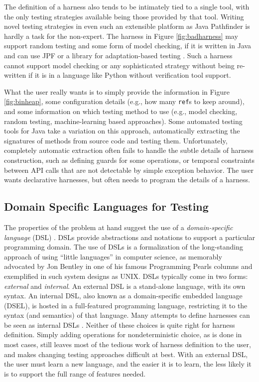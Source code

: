\documentclass[runningheads,a4paper]{llncs}
\begin{document}
The definition of a harness also tends to be intimately tied to a
single tool, with the only testing strategies available being those
provided by that tool.  Writing novel testing strategies in even such
an extensible platform as Java Pathfinder is hardly a task for the
non-expert.
The harness in Figure \ref{fig:badharness} may support random testing and
some form of model checking, if it is written in Java and can use JPF
or a library for adaptation-based testing \cite{ISSRE12}. Such a
harness cannot support model checking or any sophisticated strategy
without being re-written if it is in a language like Python without
verification tool support.

What the user really wants is to simply provide the information in
Figure \ref{fig:binheap}, some configuration details (e.g., how many
{\tt ref}s to keep around), and some information on which testing
method to use (e.g., model checking, random testing, machine-learning
based approaches).  Some automated testing tools for Java \cite{FA11,Pacheco}
take a variation on this approach, automatically extracting the
signatures of methods from source code and testing them.
Unfortunately, completely automatic extraction often fails to handle
the subtle details of harness construction, such as defining guards
for some operations, or temporal constraints between API calls that
are not detectable by simple exception behavior.  The user wants
declarative harnesses, but often needs to program the details of a
harness.

\subsection{Domain Specific Languages for Testing}

The properties of the problem at hand suggest the use of a
\emph{domain-specific language} (DSL) \cite{ISOLA12}.  DSLs
\cite{Fow10} provide abstractions and notations to support a
particular programming domain. The use of DSLs is a formalization of
the long-standing approach of using ``little languages'' in computer
science, as memorably advocated by Jon Bentley in one of his famous
Programming Pearls columns \cite{LitLang} and exemplified in such system
designs as UNIX.  DSLs typically come in two forms: \emph{external}
and \emph{internal}.  An external DSL is a stand-alone language, with
its own syntax.  An internal DSL, also known as a domain-specific
embedded language (DSEL), is hosted in a full-featured programming
language, restricting it to the syntax (and semantics) of that
language.  Many attempts to define harnesses can be seen as internal
DSLs \cite{UDITA,ISSRE12,JPF2,CBMCp,KLEE}.  Neither of these choices
is quite right for harness definition.  Simply adding operations for
nondeterministic choice, as is done in most cases, still leaves most of
the tedious work of harness definition to the user, and makes changing
testing approaches difficult at best.  With an external DSL, the user
must learn a new language, and the easier it is to learn, the less
likely it is to support the full range of features needed.
\end{document}
